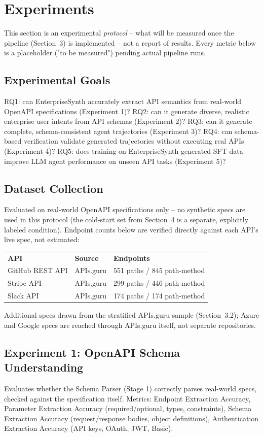 \documentclass[11pt]{article}
\begin{document}
\section{Experiments}
This section is an experimental \textit{protocol} -- what will be measured once the pipeline
(Section~3) is implemented -- not a report of results. Every metric below is a placeholder ("to be
measured") pending actual pipeline runs.

\subsection{Experimental Goals}
RQ1: can EnterpriseSynth accurately extract API semantics from real-world OpenAPI specifications
(Experiment 1)? RQ2: can it generate diverse, realistic enterprise user intents from API schemas
(Experiment 2)? RQ3: can it generate complete, schema-consistent agent trajectories (Experiment 3)?
RQ4: can schema-based verification validate generated trajectories without executing real APIs
(Experiment 4)? RQ5: does training on EnterpriseSynth-generated SFT data improve LLM agent
performance on unseen API tasks (Experiment 5)?

\subsection{Dataset Collection}
Evaluated on real-world OpenAPI specifications only -- no synthetic specs are used in this
protocol (the cold-start set from Section~4 is a separate, explicitly labeled condition). Endpoint
counts below are verified directly against each API's live spec, not estimated:

\begin{center}
\begin{tabular}{lll}
\textbf{API} & \textbf{Source} & \textbf{Endpoints} \\
GitHub REST API & APIs.guru & 551 paths / 845 path-method \\
Stripe API & APIs.guru & 299 paths / 446 path-method \\
Slack API & APIs.guru & 174 paths / 174 path-method \\
\end{tabular}
\end{center}

Additional specs drawn from the stratified APIs.guru sample (Section~3.2); Azure and Google specs
are reached through APIs.guru itself, not separate repositories.

\subsection{Experiment 1: OpenAPI Schema Understanding}
Evaluates whether the Schema Parser (Stage 1) correctly parses real-world specs, checked against
the specification itself. Metrics: Endpoint Extraction Accuracy, Parameter Extraction Accuracy
(required/optional, types, constraints), Schema Extraction Accuracy (request/response bodies,
object definitions), Authentication Extraction Accuracy (API keys, OAuth, JWT, Basic).
\end{document}

